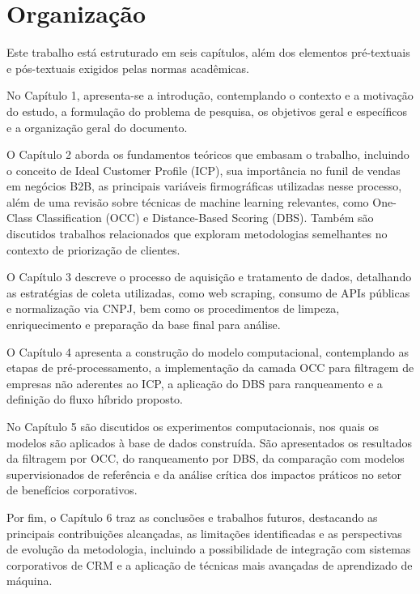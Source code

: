 \section{Organização}

Este trabalho está estruturado em seis capítulos, além dos elementos pré-textuais e pós-textuais exigidos pelas normas acadêmicas.

No Capítulo 1, apresenta-se a introdução, contemplando o contexto e a motivação do estudo, a formulação do problema de pesquisa, os objetivos geral e específicos e a organização geral do documento.  

O Capítulo 2 aborda os fundamentos teóricos que embasam o trabalho, incluindo o conceito de Ideal Customer Profile (ICP), sua importância no funil de vendas em negócios B2B, as principais variáveis firmográficas utilizadas nesse processo, além de uma revisão sobre técnicas de machine learning relevantes, como One-Class Classification (OCC) e Distance-Based Scoring (DBS). Também são discutidos trabalhos relacionados que exploram metodologias semelhantes no contexto de priorização de clientes.  

O Capítulo 3 descreve o processo de aquisição e tratamento de dados, detalhando as estratégias de coleta utilizadas, como web scraping, consumo de APIs públicas e normalização via CNPJ, bem como os procedimentos de limpeza, enriquecimento e preparação da base final para análise.  

O Capítulo 4 apresenta a construção do modelo computacional, contemplando as etapas de pré-processamento, a implementação da camada OCC para filtragem de empresas não aderentes ao ICP, a aplicação do DBS para ranqueamento e a definição do fluxo híbrido proposto.  

No Capítulo 5 são discutidos os experimentos computacionais, nos quais os modelos são aplicados à base de dados construída. São apresentados os resultados da filtragem por OCC, do ranqueamento por DBS, da comparação com modelos supervisionados de referência e da análise crítica dos impactos práticos no setor de benefícios corporativos.  

Por fim, o Capítulo 6 traz as conclusões e trabalhos futuros, destacando as principais contribuições alcançadas, as limitações identificadas e as perspectivas de evolução da metodologia, incluindo a possibilidade de integração com sistemas corporativos de CRM e a aplicação de técnicas mais avançadas de aprendizado de máquina.